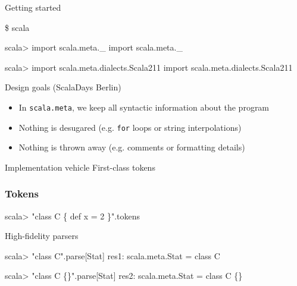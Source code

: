 \documentclass[svgnames,dvipsnames,hyperref={bookmarks=false},usepdftitle=false]{beamer}
\begin{document}

\begin{frame}[fragile]{Getting started}
\begin{semiverbatim}
\$ scala

scala> import scala.meta._
import scala.meta._

scala> import scala.meta.dialects.Scala211
import scala.meta.dialects.Scala211
\end{semiverbatim}
\end{frame}

\begin{frame}{Design goals (ScalaDays Berlin)}
\begin{itemize}
\item In \texttt{scala.meta}, we keep all syntactic information about the program
\item Nothing is desugared (e.g. \texttt{for} loops or string interpolations)
\item Nothing is thrown away (e.g. comments or formatting details)
\end{itemize}
\end{frame}

\begin{frame}{Implementation vehicle}
First-class tokens
\end{frame}

\begin{frame}[fragile]
\frametitle<1-6>{Tokens}
\begin{semiverbatim}
scala> "\alert<2>{class} \alert<3>{C} \alert<4>{\{} \alert<2>{def} \alert<3>{x} \alert<4>{=} 2 \alert<4>{\}}".tokens
\end{semiverbatim}
\end{frame}

\begin{frame}[fragile]{High-fidelity parsers}
\begin{semiverbatim}
scala> "class C".parse[Stat]
res1: scala.meta.Stat = class C

scala> "class C \alert<2->{\{\}}".parse[Stat]
res2: scala.meta.Stat = class C \{\}


\end{semiverbatim}
\end{frame}
\end{document}
